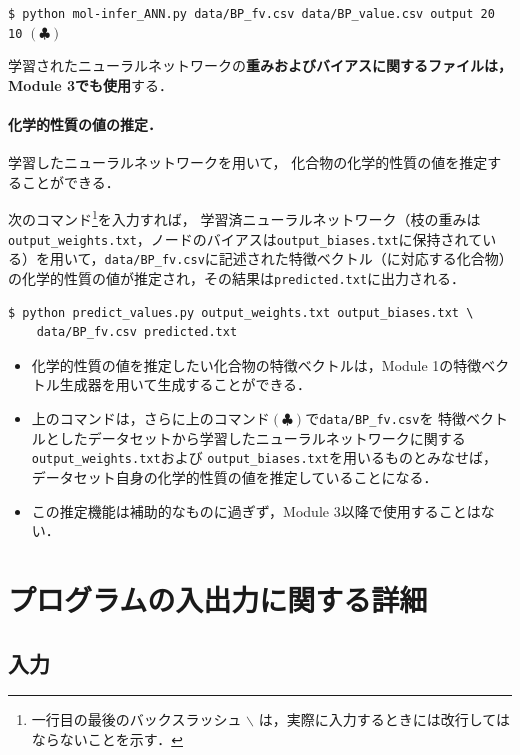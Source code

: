 \documentclass[11pt, titlepage, dvipdfmx, twoside]{jarticle}
\begin{document}
\begin{oframed}
{\small
\verb|$ python mol-infer_ANN.py data/BP_fv.csv data/BP_value.csv output 20 10|
\hfill $(\clubsuit)$}
\end{oframed}

学習されたニューラルネットワークの{\bf 重みおよびバイアスに関するファイルは，Module 3でも使用}する．


\paragraph{化学的性質の値の推定．}
学習したニューラルネットワークを用いて，
化合物の化学的性質の値を推定することができる．

次のコマンド\footnote{一行目の最後のバックスラッシュ $\backslash$ は，実際に入力するときには改行してはならないことを示す．}を入力すれば，
学習済ニューラルネットワーク（枝の重みは\verb|output_weights.txt|，ノードのバイアスは\verb|output_biases.txt|に保持されている）を用いて，\verb|data/BP_fv.csv|に記述された特徴ベクトル（に対応する化合物）の化学的性質の値が推定され，その結果は\verb|predicted.txt|に出力される．

\begin{oframed}
  {\small
\begin{verbatim}
$ python predict_values.py output_weights.txt output_biases.txt \
    data/BP_fv.csv predicted.txt
\end{verbatim}
}
  \end{oframed}

\begin{itemize}
\item 化学的性質の値を推定したい化合物の特徴ベクトルは，Module 1の特徴ベクトル生成器を用いて生成することができる．
\item 上のコマンドは，さらに上のコマンド$(\clubsuit)$で\verb|data/BP_fv.csv|を
  特徴ベクトルとしたデータセットから学習したニューラルネットワークに関する \verb|output_weights.txt|および \verb|output_biases.txt|を用いるものとみなせば，
  データセット自身の化学的性質の値を推定していることになる．
\item この推定機能は補助的なものに過ぎず，Module 3以降で使用することはない．
\end{itemize}


\section{プログラムの入出力に関する詳細}
\label{sec:io}

\subsection{入力}
\end{document}
